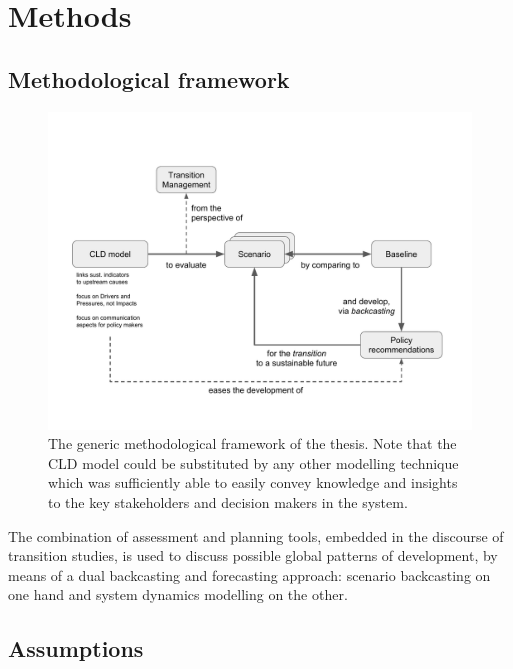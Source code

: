 \chapter{Methods}
\label{c:methods}

\section{Methodological framework}
\label{s:methods:framework}


\begin{figure}[h]
\centering
\includegraphics[trim=1cm 2cm 1.5cm 3cm,clip,width=\linewidth]{figures/thesis-aim-methods}
\caption[Thesis' methodological framework]{The generic methodological framework of the thesis. Note that the CLD model could be substituted by any other modelling technique which was sufficiently able to easily convey knowledge and insights to the key stakeholders and decision makers in the system.}
\label{fig:thesis-aim-methods}
\end{figure}

The combination of assessment and planning tools, embedded in the discourse of transition studies, is used to discuss possible global patterns of development, by means of a dual backcasting and forecasting approach: scenario backcasting on one hand and system dynamics modelling on the other.

\section{Assumptions}
\label{s:methods:assumptions}

